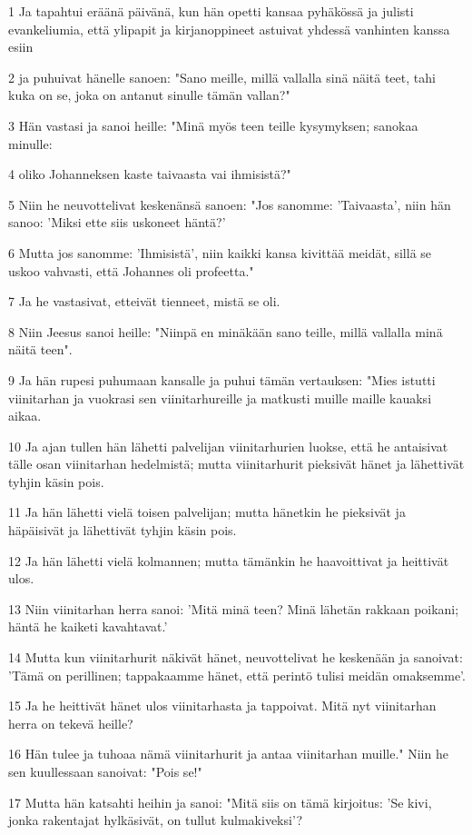 \par 1 Ja tapahtui eräänä päivänä, kun hän opetti kansaa pyhäkössä ja julisti evankeliumia, että ylipapit ja kirjanoppineet astuivat yhdessä vanhinten kanssa esiin
\par 2 ja puhuivat hänelle sanoen: "Sano meille, millä vallalla sinä näitä teet, tahi kuka on se, joka on antanut sinulle tämän vallan?"
\par 3 Hän vastasi ja sanoi heille: "Minä myös teen teille kysymyksen; sanokaa minulle:
\par 4 oliko Johanneksen kaste taivaasta vai ihmisistä?"
\par 5 Niin he neuvottelivat keskenänsä sanoen: "Jos sanomme: 'Taivaasta', niin hän sanoo: 'Miksi ette siis uskoneet häntä?'
\par 6 Mutta jos sanomme: 'Ihmisistä', niin kaikki kansa kivittää meidät, sillä se uskoo vahvasti, että Johannes oli profeetta."
\par 7 Ja he vastasivat, etteivät tienneet, mistä se oli.
\par 8 Niin Jeesus sanoi heille: "Niinpä en minäkään sano teille, millä vallalla minä näitä teen".
\par 9 Ja hän rupesi puhumaan kansalle ja puhui tämän vertauksen: "Mies istutti viinitarhan ja vuokrasi sen viinitarhureille ja matkusti muille maille kauaksi aikaa.
\par 10 Ja ajan tullen hän lähetti palvelijan viinitarhurien luokse, että he antaisivat tälle osan viinitarhan hedelmistä; mutta viinitarhurit pieksivät hänet ja lähettivät tyhjin käsin pois.
\par 11 Ja hän lähetti vielä toisen palvelijan; mutta hänetkin he pieksivät ja häpäisivät ja lähettivät tyhjin käsin pois.
\par 12 Ja hän lähetti vielä kolmannen; mutta tämänkin he haavoittivat ja heittivät ulos.
\par 13 Niin viinitarhan herra sanoi: 'Mitä minä teen? Minä lähetän rakkaan poikani; häntä he kaiketi kavahtavat.'
\par 14 Mutta kun viinitarhurit näkivät hänet, neuvottelivat he keskenään ja sanoivat: 'Tämä on perillinen; tappakaamme hänet, että perintö tulisi meidän omaksemme'.
\par 15 Ja he heittivät hänet ulos viinitarhasta ja tappoivat. Mitä nyt viinitarhan herra on tekevä heille?
\par 16 Hän tulee ja tuhoaa nämä viinitarhurit ja antaa viinitarhan muille." Niin he sen kuullessaan sanoivat: "Pois se!"
\par 17 Mutta hän katsahti heihin ja sanoi: "Mitä siis on tämä kirjoitus: 'Se kivi, jonka rakentajat hylkäsivät, on tullut kulmakiveksi'?
